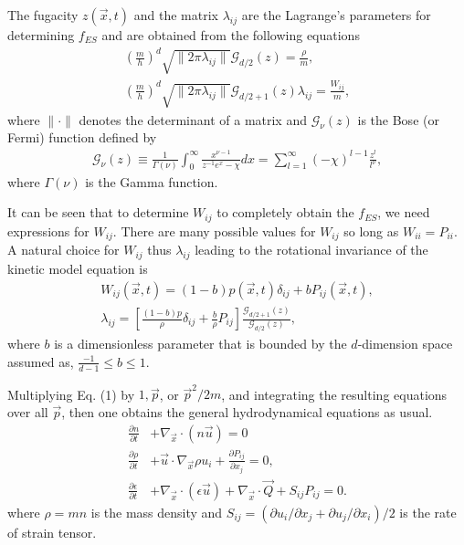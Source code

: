 \documentclass[doublecol]{epl2}
\begin{document}
The fugacity $z(\vec x,t)$ and the matrix $\lambda_{i j}$ are the Lagrange's parameters for determining $f_{ES}$ and are obtained from the following equations
\begin{align}
\left(\frac{m}{h}\right)^d \sqrt{ \|2 \pi \lambda_{i j}\| } \mathcal{G}_{d/2}(z) = \frac{\rho}{m}, \\
\left(\frac{m}{h}\right)^d \sqrt{ \|2 \pi \lambda_{i j}\| } \mathcal{G}_{d/2 +1}(z) \lambda_{i j} = \frac{W_{i j}}{m},
\end{align}
where $\| \cdot \|$ denotes the determinant of a matrix and $\mathcal{G}_{\nu}(z)$ is the Bose (or Fermi) function defined by
\begin{align}
\mathcal{G}_{\nu}(z) \equiv \frac{1}{\Gamma(\nu)} \int^{\infty}_0 \frac{ x^{\nu
-1} }{ {z^{-1} e^x - \chi}}dx = \sum^{\infty}_{l=1}
(-\chi)^{l-1} \frac{z^l}{l^{\nu}},
\end{align}
where $\Gamma(\nu)$ is the Gamma function.

It can be seen that to determine $W_{i j} $ to completely obtain the $f_{ES}$, we need expressions for $W_{i j}$.   There are many possible values for $W_{i j}$ so long as $W_{i i}=P_{i i}$.   A natural choice for $W_{ij}$ thus $\lambda_{i j}$ leading to the rotational invariance of the kinetic model equation is \cite{Holway1966}
\begin{align}
W_{i j}(\vec x, t) = (1 - b) p(\vec x, t) \delta_{i j} + b P_{i j}(\vec x, t), \\
\lambda_{i j} = \left[\frac{(1-b)p}{\rho} \delta_{i j}+ \frac{b}{\rho}P_{i j } \right] \frac{\mathcal{G}_{d/2+1}(z)}{\mathcal{G}_{d/2}(z)},
\end{align}
where $b$ is a dimensionless parameter that is bounded by the $d$-dimension space assumed as, $\frac{-1}{d-1} \le b \le 1$.

Multiplying Eq. (1) by $1, \vec p$, or $\vec p^2/2m$, and integrating the resulting equations over all $\vec p$, then one obtains the general hydrodynamical equations as usual.
\begin{align}
\frac{\partial n}{\partial t} &+ \nabla_{\vec x} \cdot (n \vec u) = 0 \\
\frac{\partial \rho}{\partial t} &+ \vec u \cdot \nabla_{\vec x} \rho u_{i} + \frac{\partial P_{ij}}{\partial x_{j} } = 0, \\
\frac{\partial \epsilon}{\partial t} &+ \nabla_{\vec x} \cdot (\epsilon \vec u) + \nabla_{\vec x} \cdot \vec Q + S_{ij} P_{ij} = 0.
\end{align}
where $\rho=m n$ is the mass density and $S_{ij}=(\partial u_{i}/\partial x_{j} + \partial u_{j}/\partial x_{i})/2$ is the rate of strain tensor.
\end{document}
